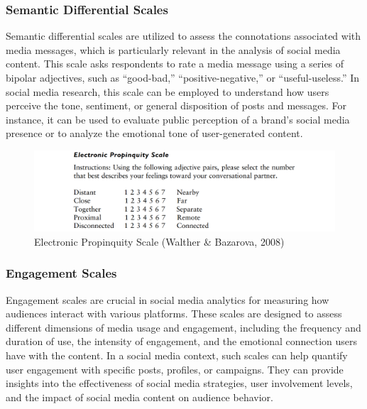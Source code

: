 \documentclass[
]{book}
\begin{document}
\hypertarget{semantic-differential-scales}{%
\subsubsection*{Semantic Differential Scales}\label{semantic-differential-scales}}

Semantic differential scales are utilized to assess the connotations associated with media messages, which is particularly relevant in the analysis of social media content. This scale asks respondents to rate a media message using a series of bipolar adjectives, such as ``good-bad,'' ``positive-negative,'' or ``useful-useless.'' In social media research, this scale can be employed to understand how users perceive the tone, sentiment, or general disposition of posts and messages. For instance, it can be used to evaluate public perception of a brand's social media presence or to analyze the emotional tone of user-generated content.

\begin{figure}
\centering
\includegraphics[width=1\textwidth,height=\textheight]{images/propinquity.png}
\caption{Electronic Propinquity Scale (Walther \& Bazarova, 2008)}
\end{figure}

\hypertarget{engagement-scales}{%
\subsubsection*{Engagement Scales}\label{engagement-scales}}

Engagement scales are crucial in social media analytics for measuring how audiences interact with various platforms. These scales are designed to assess different dimensions of media usage and engagement, including the frequency and duration of use, the intensity of engagement, and the emotional connection users have with the content. In a social media context, such scales can help quantify user engagement with specific posts, profiles, or campaigns. They can provide insights into the effectiveness of social media strategies, user involvement levels, and the impact of social media content on audience behavior.
\end{document}
